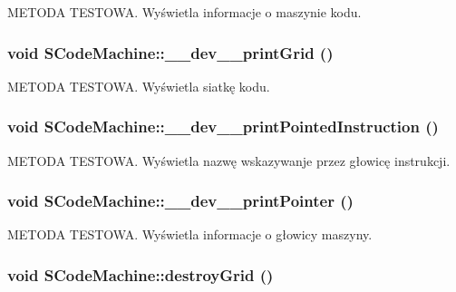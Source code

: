 METODA TESTOWA. Wyświetla informacje o maszynie kodu. \hypertarget{classSCodeMachine_0ea93dafdabff0ff080a24b6c8ef9ea1}{
\subsubsection[{\_\-\_\-dev\_\-\_\-printGrid}]{\setlength{\rightskip}{0pt plus 5cm}void SCodeMachine::\_\-\_\-dev\_\-\_\-printGrid ()}}
\label{classSCodeMachine_0ea93dafdabff0ff080a24b6c8ef9ea1}


METODA TESTOWA. Wyświetla siatkę kodu. \hypertarget{classSCodeMachine_6a725d341bffacccb53431f88c62b713}{
\subsubsection[{\_\-\_\-dev\_\-\_\-printPointedInstruction}]{\setlength{\rightskip}{0pt plus 5cm}void SCodeMachine::\_\-\_\-dev\_\-\_\-printPointedInstruction ()}}
\label{classSCodeMachine_6a725d341bffacccb53431f88c62b713}


METODA TESTOWA. Wyświetla nazwę wskazywanje przez głowicę instrukcji. \hypertarget{classSCodeMachine_b4c8492fda9fe21cc2620ede3630d852}{
\subsubsection[{\_\-\_\-dev\_\-\_\-printPointer}]{\setlength{\rightskip}{0pt plus 5cm}void SCodeMachine::\_\-\_\-dev\_\-\_\-printPointer ()}}
\label{classSCodeMachine_b4c8492fda9fe21cc2620ede3630d852}


METODA TESTOWA. Wyświetla informacje o głowicy maszyny. \hypertarget{classSCodeMachine_54ad5c55c2afe66dedececed9846e5d1}{
\subsubsection[{destroyGrid}]{\setlength{\rightskip}{0pt plus 5cm}void SCodeMachine::destroyGrid ()}}
\label{classSCodeMachine_54ad5c55c2afe66dedececed9846e5d1}


